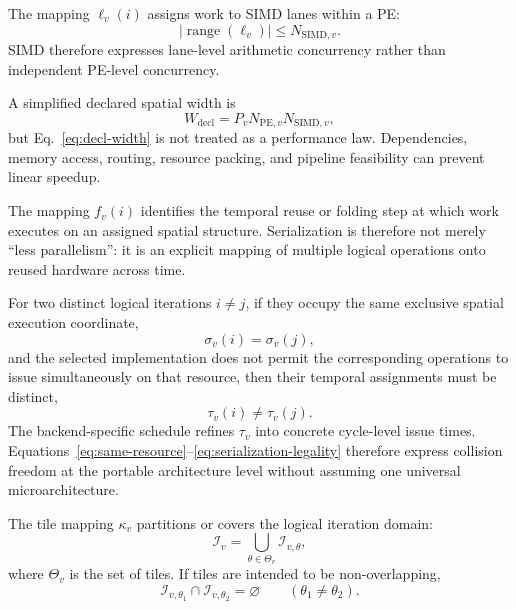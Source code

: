 \documentclass{article}
\begin{document}
The mapping $\ell_v(i)$ assigns work to SIMD lanes within a PE:
\begin{equation}
|\operatorname{range}(\ell_v)|\le N_{\mathrm{SIMD},v}.
\label{eq:simd-cardinality}
\end{equation}
SIMD therefore expresses lane-level arithmetic concurrency rather than independent PE-level concurrency.

A simplified declared spatial width is
\begin{equation}
W_{\mathrm{decl}}
=
P_v
N_{\mathrm{PE},v}
N_{\mathrm{SIMD},v},
\label{eq:decl-width}
\end{equation}
but Eq.~\ref{eq:decl-width} is not treated as a performance law. Dependencies, memory access, routing, resource packing, and pipeline feasibility can prevent linear speedup.


The mapping $f_v(i)$ identifies the temporal reuse or folding step at which work executes on an assigned spatial structure. Serialization is therefore not merely ``less parallelism'': it is an explicit mapping of multiple logical operations onto reused hardware across time.

For two distinct logical iterations $i\neq j$, if they occupy the same exclusive spatial execution coordinate,
\begin{equation}
\sigma_v(i)=\sigma_v(j),
\label{eq:same-resource}
\end{equation}
and the selected implementation does not permit the corresponding operations to issue simultaneously on that resource, then their temporal assignments must be distinct,
\begin{equation}
\tau_v(i)\neq\tau_v(j).
\label{eq:serialization-legality}
\end{equation}
The backend-specific schedule refines $\tau_v$ into concrete cycle-level issue times. Equations~\ref{eq:same-resource}--\ref{eq:serialization-legality} therefore express collision freedom at the portable architecture level without assuming one universal microarchitecture.


The tile mapping $\kappa_v$ partitions or covers the logical iteration domain:
\begin{equation}
\mathcal{I}_v
=
\bigcup_{\theta\in\Theta_v}
\mathcal{I}_{v,\theta},
\label{eq:tile-cover}
\end{equation}
where $\Theta_v$ is the set of tiles. If tiles are intended to be non-overlapping,
\begin{equation}
\mathcal{I}_{v,\theta_1}
\cap
\mathcal{I}_{v,\theta_2}
=
\varnothing
\qquad
(\theta_1\neq\theta_2).
\label{eq:tile-disjoint}
\end{equation}
\end{document}
